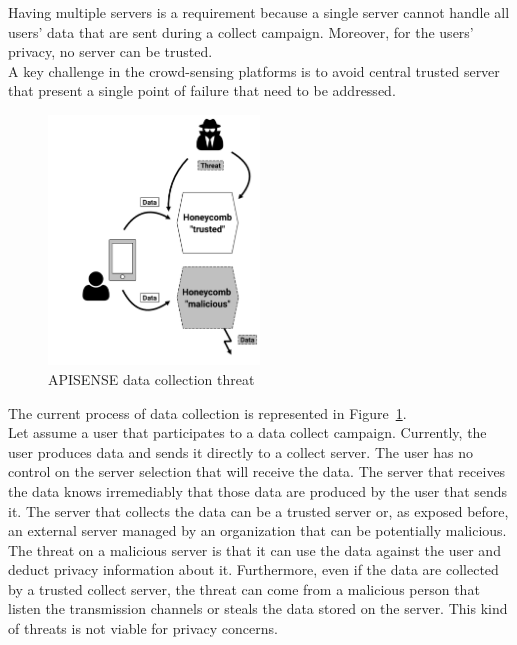 Having multiple servers is a requirement because a single server cannot handle all users' data that are sent during a collect campaign.
Moreover, for the users' privacy, no server can be trusted.
\\

A key challenge in the crowd-sensing platforms is to avoid central trusted server that present a single point of failure that need to be addressed.

\begin{figure}[h]
    \centering
    \includegraphics[width=0.5\textwidth]{figures/threat}
    \caption{\label{Threat} APISENSE data collection threat}
\end{figure}

The current process of data collection is represented in Figure~\ref{Threat}.
\\

Let assume a user that participates to a data collect campaign.
Currently, the user produces data and sends it directly to a collect server.
The user has no control on the server selection that will receive the data.
The server that receives the data knows irremediably that those data are produced by the user that sends it.
The server that collects the data can be a trusted server or, as exposed before, an external server managed by an organization that can be potentially malicious.
The threat on a malicious server is that it can use the data against the user and deduct privacy information about it.
Furthermore, even if the data are collected by a trusted collect server, the threat can come from a malicious person that listen the transmission channels or steals the data stored on the server.
This kind of threats is not viable for privacy concerns.
\\

